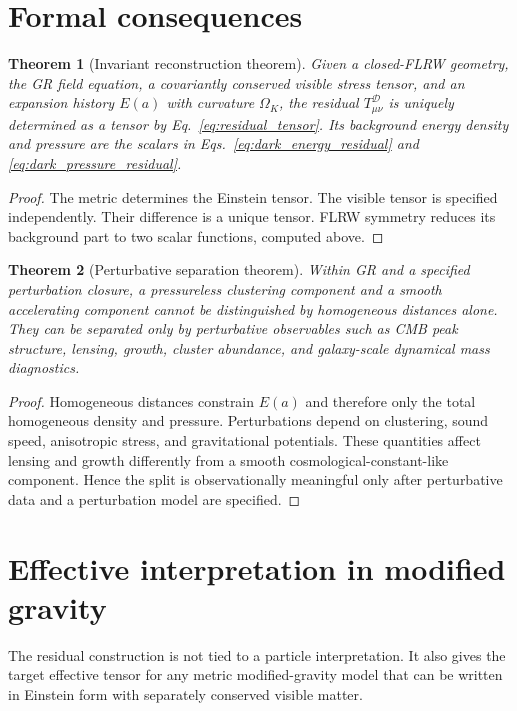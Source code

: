\documentclass[
  aps,
  prd,
  reprint,
  superscriptaddress,
  nofootinbib,
  floatfix,
  longbibliography
]{revtex4-2}
\theoremstyle{plain}
\newtheorem{theorem}{Theorem}[section]
\theoremstyle{definition}
\theoremstyle{remark}
\newcommand{\D}{\mathcal D}
\begin{document}
\section{Formal consequences}

\begin{theorem}[Invariant reconstruction theorem]
Given a closed-FLRW geometry, the GR field equation, a covariantly conserved
visible stress tensor, and an expansion history $E(a)$ with curvature
$\Omega_K$, the residual $T^\D_{\mu\nu}$ is uniquely determined as a tensor by
Eq.~\eqref{eq:residual_tensor}.  Its background energy density and pressure are
the scalars in Eqs.~\eqref{eq:dark_energy_residual} and
\eqref{eq:dark_pressure_residual}.
\end{theorem}

\begin{proof}
The metric determines the Einstein tensor.  The visible tensor is specified
independently.  Their difference is a unique tensor.  FLRW symmetry reduces its
background part to two scalar functions, computed above.
\end{proof}

\begin{theorem}[Perturbative separation theorem]
Within GR and a specified perturbation closure, a pressureless clustering
component and a smooth accelerating component cannot be distinguished by
homogeneous distances alone.  They can be separated only by perturbative
observables such as CMB peak structure, lensing, growth, cluster abundance, and
galaxy-scale dynamical mass diagnostics.
\end{theorem}

\begin{proof}
Homogeneous distances constrain $E(a)$ and therefore only the total homogeneous
density and pressure.  Perturbations depend on clustering, sound speed,
anisotropic stress, and gravitational potentials.  These quantities affect
lensing and growth differently from a smooth cosmological-constant-like
component.  Hence the split is observationally meaningful only after
perturbative data and a perturbation model are specified.
\end{proof}

\section{Effective interpretation in modified gravity}

The residual construction is not tied to a particle interpretation.  It also
gives the target effective tensor for any metric modified-gravity model that can
be written in Einstein form with separately conserved visible matter.
\end{document}
